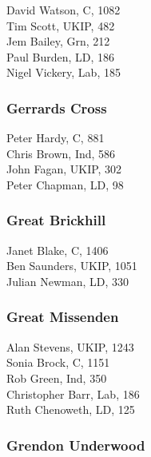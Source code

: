 \documentclass[a4paper,openany,10pt]{book}
\begin{document}
David Watson, C, 1082\\
Tim Scott, UKIP, 482\\
Jem Bailey, Grn, 212\\
Paul Burden, LD, 186\\
Nigel Vickery, Lab, 185\\


\subsubsection*{Gerrards Cross}



Peter Hardy, C, 881\\
Chris Brown, Ind, 586\\
John Fagan, UKIP, 302\\
Peter Chapman, LD, 98\\


\subsubsection*{Great Brickhill}



Janet Blake, C, 1406\\
Ben Saunders, UKIP, 1051\\
Julian Newman, LD, 330\\


\subsubsection*{Great Missenden}



Alan Stevens, UKIP, 1243\\
Sonia Brock, C, 1151\\
Rob Green, Ind, 350\\
Christopher Barr, Lab, 186\\
Ruth Chenoweth, LD, 125\\


\subsubsection*{Grendon Underwood}

\end{document}
